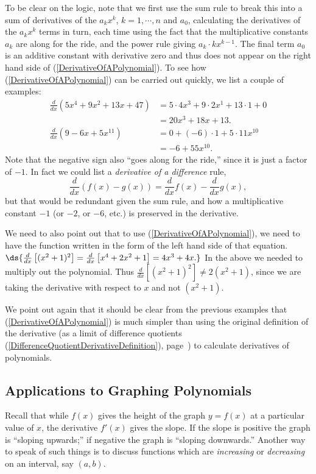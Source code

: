 To be clear on the logic, note that we first use the sum rule to
break this into a sum of derivatives of the $a_kx^k$, $k=1,\cdots,n$
and $a_0$, 
calculating the derivatives of the $a_kx^k$ terms in 
turn, each time  using the fact that the 
multiplicative constants $a_k$ are along
for the ride, and the power rule giving $a_k\cdot kx^{k-1}$.
The final term $a_0$ is an additive constant
with  derivative zero and thus does 
not appear on the right hand side of (\ref{DerivativeOfAPolynomial}).
%
\bex To see how (\ref{DerivativeOfAPolynomial}) can be
carried out quickly, we list a couple of examples:
\begin{align*}
\frac{d}{dx}\left(5x^4+9x^2+13x+47\right)&=5\cdot4x^3+9\cdot2x^1+13\cdot1+0\\
             &=20x^3+18x+13.\\
\frac{d}{dx}\left(9-6x+5x^{11}\right)&=0+(-6)\cdot1+5\cdot11x^{10}    \\
             &=-6+55x^{10}.\end{align*}
\label{PolynomialDerivativeExample}\eex
%
Note that the negative sign also  ``goes along for the ride,'' since
it is just a factor of $-1$.  In fact we could list
a {\it derivative of a difference} rule,
$$\frac{d}{dx}\left(f(x)-g(x)\right)=\frac{d}{dx}f(x)-\frac{d}{dx}g(x),$$
but that would be redundant given the sum rule, and
how a multiplicative constant $-1$ (or $-2$, or $-6$, etc.) is preserved 
in the derivative.

We need to also point out that to use (\ref{DerivativeOfAPolynomial}),
we need to have the function written in the form of the left hand side of that
equation. 
\bex $\ds{\frac{d}{dx}\left[(x^2+1)^2\right]
=\frac{d}{dx}\left[x^4+2x^2+1\right]=4x^3+4x.}$\eex
In the above we needed to multiply out the polynomial.
Thus $\frac{d}{dx}[(x^2+1)^2]\ne2(x^2+1)$,
since we are taking the derivative with respect
to $x$ and not $(x^2+1)$.

We point out again that it should be clear from the previous examples that
(\ref{DerivativeOfAPolynomial}) is much simpler than using the
original definition of the derivative (as a limit of difference
quotients (\ref{DifferenceQuotientDerivativeDefinition}),
page~\pageref{DifferenceQuotientDerivativeDefinition})
to calculate derivatives of polynomials.

\subsection{Applications to Graphing Polynomials}
Recall that while $f(x)$ gives the height of the graph $y=f(x)$
at a particular value of $x$, the derivative $f'(x)$
gives the slope.  If the slope is positive the graph
is ``sloping upwards;'' if negative the graph is ``sloping
downwards.''  Another way to speak of such things is
to discuss functions which are {\it increasing} or {\it decreasing}
on an interval, say $(a,b)$.

